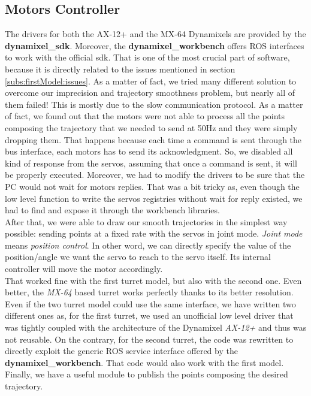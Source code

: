 \subsection{Motors Controller}
The drivers for both the AX-12+ and the MX-64 Dynamixels are provided by the \textbf{dynamixel\_sdk}. Moreover, the \textbf{dynamixel\_workbench} offers ROS interfaces to work with the official sdk. That is one of the most crucial part of software, because it is directly related to the issues mentioned in section \ref{subs:firstModel:issues}. As a matter of fact, we tried many different solution to overcome our imprecision and trajectory smoothness problem, but nearly all of them failed! This is mostly due to the slow communication protocol. As a matter of fact, we found out that the motors were not able to process all the points composing the trajectory that we needed to send at 50Hz and they were simply dropping them. That happens because each time a command is sent through the bus interface, each motors has to send its acknowledgment. So, we disabled all kind of response from the servos, assuming that once a command is sent, it will be properly executed. Moreover, we had to modify the drivers to be sure that the PC would not wait for motors replies. That was a bit tricky as, even though the low level function to write the servos registries without wait for reply existed, we had to find and expose it through the workbench libraries.\\
After that, we were able to draw our smooth trajectories in the simplest way possible: sending points at a fixed rate with the servos in joint mode. \emph{Joint mode} means \emph{position control}. In other word, we can directly specify the value of the position/angle we want the servo to reach to the servo itself. Its internal controller will move the motor accordingly.\\
That worked fine with the first turret model, but also with the second one. Even better, the \emph{MX-64} based turret works perfectly thanks to its better resolution.\\

Even if the two turret model could use the same interface, we have written two different ones as, for the first turret, we used an unofficial low level driver that was tightly coupled with the architecture of the Dynamixel \emph{AX-12+} and thus was not reusable. On the contrary, for the second turret, the code was rewritten to directly exploit the generic ROS service interface offered by the \textbf{dynamixel\_workbench}. That code would also work with the first model.\\
Finally, we have a useful module to publish the points composing the desired trajectory.

